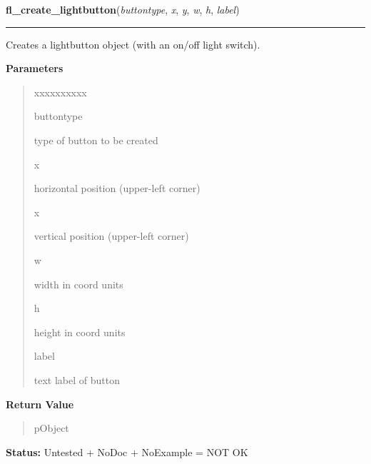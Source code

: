     \label{xformslib:library:fl_create_lightbutton}

    \vspace{0.5ex}

\hspace{.8\funcindent}\begin{boxedminipage}{\funcwidth}

    \raggedright \textbf{fl\_create\_lightbutton}(\textit{buttontype}, \textit{x}, \textit{y}, \textit{w}, \textit{h}, \textit{label})

    \vspace{-1.5ex}

    \rule{\textwidth}{0.5\fboxrule}
\setlength{\parskip}{2ex}
    Creates a lightbutton object  (with an on/off light switch).

\setlength{\parskip}{1ex}
      \textbf{Parameters}
      \vspace{-1ex}

      \begin{quote}
        \begin{Ventry}{xxxxxxxxxx}

          \item[buttontype]

          type of button to be created

          \item[x]

          horizontal position (upper-left corner)

          \item[x]

          vertical position (upper-left corner)

          \item[w]

          width in coord units

          \item[h]

          height in coord units

          \item[label]

          text label of button

        \end{Ventry}

      \end{quote}

      \textbf{Return Value}
    \vspace{-1ex}

      \begin{quote}
      pObject

      \end{quote}

\textbf{Status:} Untested + NoDoc + NoExample = NOT OK



    \end{boxedminipage}

